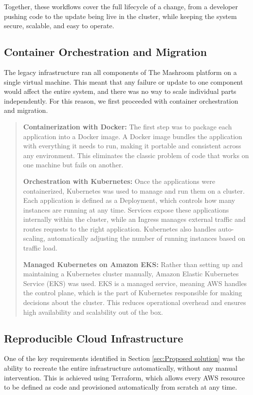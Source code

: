 Together, these workflows cover the full lifecycle of a change, from a 
developer pushing code to the update being live in the cluster, 
while keeping the system secure, scalable, and easy to operate.

\subsection{Container Orchestration and Migration}

The legacy infrastructure ran all components of The Mashroom platform on a 
single virtual machine. This meant that any failure or update to one component 
would affect the entire system, and there was no way to scale individual parts 
independently. For this reason, we first proceeded with container orchestration and migration.

\begin{quote}

\textbf{Containerization with Docker:}
The first step was to package each application into a Docker image. A Docker 
image bundles the application with everything it needs to run, making it 
portable and consistent across any environment. This eliminates the classic 
problem of code that works on one machine but fails on another.

\textbf{Orchestration with Kubernetes:}
Once the applications were containerized, Kubernetes was used to manage and 
run them on a cluster. Each application is defined as a Deployment, which 
controls how many instances are running at any time. Services expose these 
applications internally within the cluster, while an Ingress manages external 
traffic and routes requests to the right application. Kubernetes also handles 
auto-scaling, automatically adjusting the number of running instances based 
on traffic load.

\textbf{Managed Kubernetes on Amazon EKS:}
Rather than setting up and maintaining a Kubernetes cluster manually, Amazon 
Elastic Kubernetes Service (EKS) was used. EKS is a managed service, meaning 
AWS handles the control plane, which is the part of Kubernetes responsible for 
making decisions about the cluster. This reduces operational overhead and 
ensures high availability and scalability out of the box.

\end{quote}
\subsection{Reproducible Cloud Infrastructure}
One of the key requirements identified in Section \ref{sec:Proposed solution} was the 
ability to recreate the entire infrastructure automatically, without any manual 
intervention. This is achieved using Terraform, which allows every AWS resource 
to be defined as code and provisioned automatically from scratch at any time.

